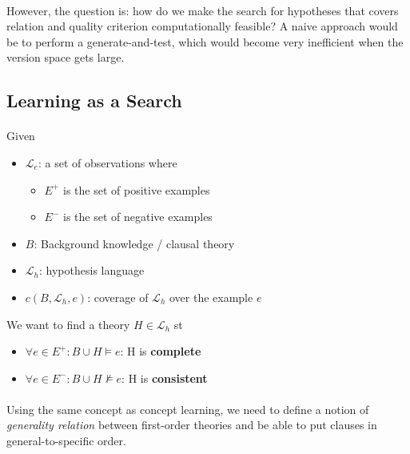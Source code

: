 \documentclass{article}
\theoremstyle{plain}
\theoremstyle{definition}
\begin{document}
\begin{multicols}{2}
\paragraph{} However, the question is: how do we make the search for hypotheses that covers relation and quality criterion computationally feasible? A naive approach would be to perform a generate-and-test, which would become very inefficient when the version space gets large.

\subsection{Learning as a Search}

\paragraph{} Given 

\begin{itemize}
\setlength\itemsep{0.1em}
\item $\mathcal{L}_e$: a set of observations where
	\begin{itemize}
	\item $E^+$ is the set of positive examples
	\item $E^-$ is the set of negative examples
	\end{itemize}
\item $B$: Background knowledge / clausal theory
\item $\mathcal{L}_h$: hypothesis language
\item $c(B, \mathcal{L}_h, e)$: coverage of $\mathcal{L}_h$ over the example $e$
\end{itemize}

\noindent We want to find a theory $H \in \mathcal{L}_h$ st

\begin{itemize}
\setlength\itemsep{0.1em}
\item $\forall e \in E^+: B \cup H \models e$: H is \textbf{complete}
\item $\forall e \in E^-: B \cup H \not\models e$: H is \textbf{consistent}
\end{itemize}

\paragraph{} Using the same concept as concept learning, we need to define a notion of \textit{generality relation} between first-order theories and be able to put clauses in general-to-specific order.


\end{multicols}
\end{document}
